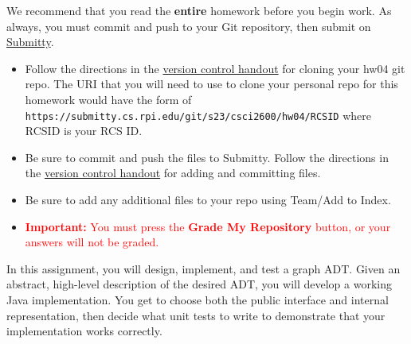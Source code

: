 \documentclass[11pt]{article}
\begin{document}
\noindent{}
\par
\noindent We recommend that you read the \textbf{entire} homework before you begin work. As always, you must commit and push to your Git repository, then submit on \href{https://submitty.cs.rpi.edu/courses/s23/csci2600}{Submitty}.
\newline

\begin{itemize}
\item  
Follow the directions in the \href{https://www.cs.rpi.edu/academics/courses/spring23/csci2600/Documents/eclipse_and_git.pdf}{version control handout} for cloning your hw04 git repo. The URI that you will need to use to clone your personal repo for this homework would have the form of \texttt{https://submitty.cs.rpi.edu/git/s23/csci2600/hw04/RCSID} where RCSID is your RCS ID.

\item
Be sure to commit and push the files to Submitty. Follow the directions in the \href{https://www.cs.rpi.edu/academics/courses/spring23/csci2600/Documents/eclipse_and_git.pdf}{version control handout} for adding and committing files.

\item
Be sure to add any additional files to your repo using Team/Add to Index.

\item
\textcolor{red}{\textbf{Important:} You must press the \textbf{Grade My Repository} button, or your answers will not be graded.}
\end{itemize}

\newline

\noindent In this assignment, you will design, implement, and test a graph ADT. Given an abstract, high-level description of the desired ADT, you will develop a working Java implementation. You get to choose both the public interface and internal representation, then decide what unit tests to write to demonstrate that your implementation works correctly.
\newline
\end{document}
